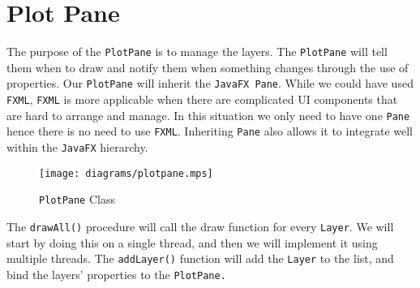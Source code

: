 \documentclass[../../../../../main.tex]{subfiles}
\begin{document}
\section{Plot Pane}
The purpose of the \texttt{PlotPane} is to manage the layers. The \texttt{PlotPane} will tell them when to draw and notify them when something changes through the use of properties. Our \texttt{PlotPane} will inherit the \texttt{JavaFX Pane}. While we could have used \texttt{FXML}, \texttt{FXML} is more applicable when there are complicated UI components that are hard to arrange and manage. In this situation we only need to have one \texttt{Pane} hence there is no need to use \texttt{FXML}. Inheriting \texttt{Pane} also allows it to integrate well within the \texttt{JavaFX} hierarchy.

\begin{figure}[H]
	\centering
	\texttt{[image: diagrams/plotpane.mps]}
	\caption{\texttt{PlotPane} Class}
\end{figure}

The \texttt{drawAll()} procedure will call the draw function for every \texttt{Layer}. We will start by doing this on a single thread, and then we will implement it using multiple threads.  The \texttt{addLayer()} function will add the \texttt{Layer} to the list, and bind the layers' properties to the \texttt{PlotPane.}
\newpage
\end{document}
